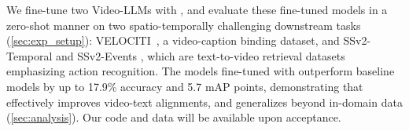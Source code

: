 We fine-tune two Video-LLMs with \method{},
and evaluate these fine-tuned models in a zero-shot manner on two spatio-temporally challenging downstream tasks (\autoref{sec:exp_setup}): VELOCITI~\cite{saravanan2024velociti}, a video-caption binding dataset, and SSv2-Temporal \cite{sevilla2021only} and SSv2-Events \cite{bagad2023test}, which are text-to-video retrieval datasets emphasizing action recognition.
The models fine-tuned with \method{} outperform baseline models by up to 17.9\% accuracy and 5.7 mAP points, 
demonstrating that \method{} effectively improves video-text alignments, and generalizes beyond in-domain data (\autoref{sec:analysis}). 
Our code and data will be available upon acceptance.


